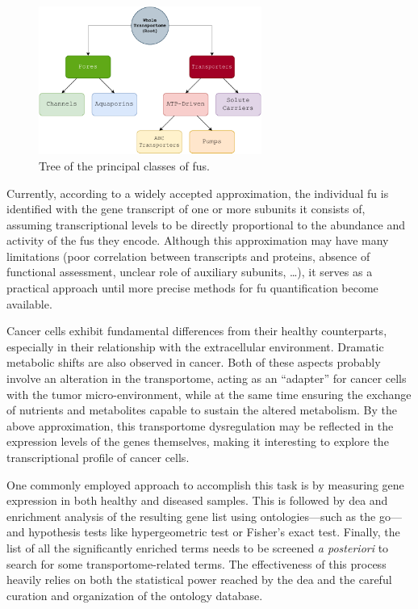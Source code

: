 \begin{figure}
    \centering
    \includegraphics[width=0.65\textwidth]{resources/images/BasicTree.pdf}
    \caption{Tree of the principal classes of \glspl{fu}.}
    \label{fig:BasicTree}
\end{figure}

Currently, according to a widely accepted approximation, the individual \gls{fu} is identified with the gene transcript of one or more subunits it consists of, assuming transcriptional levels to be directly proportional to the abundance and activity of the \glspl{fu} they encode.
Although this approximation may have many limitations (poor correlation between transcripts and proteins, absence of functional assessment, unclear role of auxiliary subunits, \ldots), it serves as a practical approach until more precise methods for \gls{fu} quantification become available.


Cancer cells exhibit fundamental differences from their healthy counterparts, especially in their relationship with the extracellular environment.
Dramatic metabolic shifts are also observed in cancer.
Both of these aspects probably involve an alteration in the transportome, acting as an ``adapter'' for cancer cells with the tumor micro-environment, while at the same time ensuring the exchange of nutrients and metabolites capable to sustain the altered metabolism.
By the above approximation, this transportome dysregulation may be reflected in the expression levels of the genes themselves, making it interesting to explore the transcriptional profile of cancer cells.

One commonly employed approach to accomplish this task is by measuring gene expression in both healthy and diseased samples.
This is followed by \gls{dea} and enrichment analysis of the resulting gene list using ontologies---such as the \gls{go}---and hypothesis tests like hypergeometric test or Fisher's exact test.
Finally, the list of all the significantly enriched terms needs to be screened \textit{a posteriori} to search for some transportome-related terms.
The effectiveness of this process heavily relies on both the statistical power reached by the \gls{dea} and the careful curation and organization of the ontology database.

